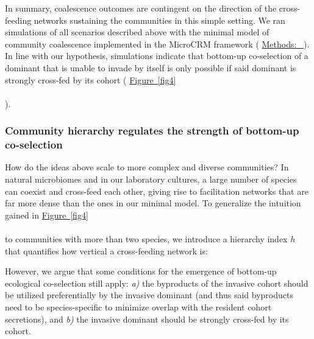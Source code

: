 \documentclass[a4paper,10pt]{article}
\newcommand{\figref}[2][]{%
  \hyperref[{#2}]{%
    Figure~\ref*{#2}%
    \ifx\\#1\\%
    \else
      #1%
    \fi
  }%
}
\newcommand{\methodsref}[1]{%
  \hyperref[{methods:#1}]{%
   Methods:~\nameref*{methods:#1}%
  }%
}
\begin{document}
In summary, coalescence outcomes are contingent on the direction of the
cross-feeding networks sustaining the communities in this simple setting.
We ran simulations of all scenarios described above with the minimal model of community coalescence
implemented in the MicroCRM framework
(\methodsref{sim-min}).
In line with our hypothesis, simulations indicate that
bottom-up co-selection of a dominant that is unable to invade by itself
is only possible if said dominant is strongly cross-fed by its cohort
(\figref{fig4}).

\subsubsection*{Community hierarchy regulates the strength of bottom-up co-selection}

How do the ideas above scale to more complex and diverse communities?
In natural microbiomes and in our laboratory cultures,
a large number of species can coexist and cross-feed each other,
giving rise to facilitation networks that are far more dense
than the ones in our minimal model.
To generalize the intuition gained in \figref{fig4} to communities with more than two species,
we introduce a hierarchy index $h$ that quantifies how vertical a cross-feeding network is:

\iffalse
However, we argue that some conditions
for the emergence of bottom-up ecological co-selection still apply:
\textit{a)} the byproducts of the invasive cohort should be utilized preferentially
by the invasive dominant (and thus said byproducts need to be species-specific
to minimize overlap with the resident cohort secretions),
and \textit{b)} the invasive dominant should be strongly cross-fed by its cohort.
\end{document}
